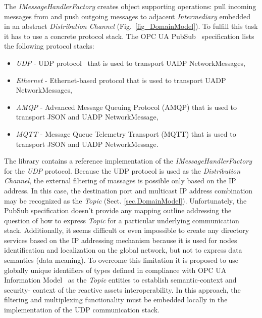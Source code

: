 \documentclass{jacsart}
\begin{document}
The \emph{IMessageHandlerFactory} creates object supporting operations: pull incoming messages from and push outgoing messages to adjacent \emph{Intermediary} embedded in an abstract \emph{Distribution Channel} (Fig.~\ref*{fig_DomainModel}). To fulfill this task it has to use a concrete protocol stack. The OPC UA PubSub \cite{RefWorks:doc:5d98837de4b055984c0eecf0}~specification lists the following protocol stacks:

\begin{itemize}
  \item \emph{UDP} - UDP protocol~\cite{RefWorks:doc:5d8e1874e4b0bc72a68f0d11} that is used to transport UADP NetworkMessages,
  \item \emph{Ethernet} - Ethernet-based protocol that is used to transport UADP NetworkMessages,
  \item \emph{AMQP} - Advanced Message Queuing Protocol (AMQP) \cite{RefWorks:doc:5d91d2d9e4b0bc72a68ffe06} that is used to transport JSON and UADP NetworkMessage,
  \item \emph{MQTT} - Message Queue Telemetry Transport (MQTT) \cite{RefWorks:doc:5d91e158e4b02eb43d36bb97} that is used to transport JSON and UADP NetworkMessage.
\end{itemize}

The library \cite{RefWorks:doc:5c66740ae4b081adf5804596} contains a reference implementation of the \emph{IMessageHandlerFactory} for the \emph{UDP} protocol. Because the UDP protocol is used as the \emph{Distribution Channel}, the external filtering of massages is possible only based on the IP address. In this case, the destination port and multicast IP address combination may be recognized as the \emph{Topic} (Sect. \ref*{sec.DomainModel}). Unfortunately, the PubSub specification doesn't provide any mapping outline addressing the question of how to express \emph{Topic} for a particular underlying communication stack. Additionally, it seems difficult or even impossible to create any directory services based on the IP addressing mechanism because it is used for nodes identification and localization on the global network, but not to express data semantics (data meaning). To overcome this limitation it is proposed to use globally unique identifiers of types defined in compliance with OPC UA Information Model~\cite{RefWorks:doc:5ac86c99e4b009947bbb87c9, RefWorks:doc:5ac86c98e4b009947bbb874c} as the \emph{Topic} entities to establish semantic-context and security- context of the reactive assets interoperability. In this approach, the filtering and multiplexing functionality must be embedded locally in the implementation of the UDP communication stack.
\end{document}
